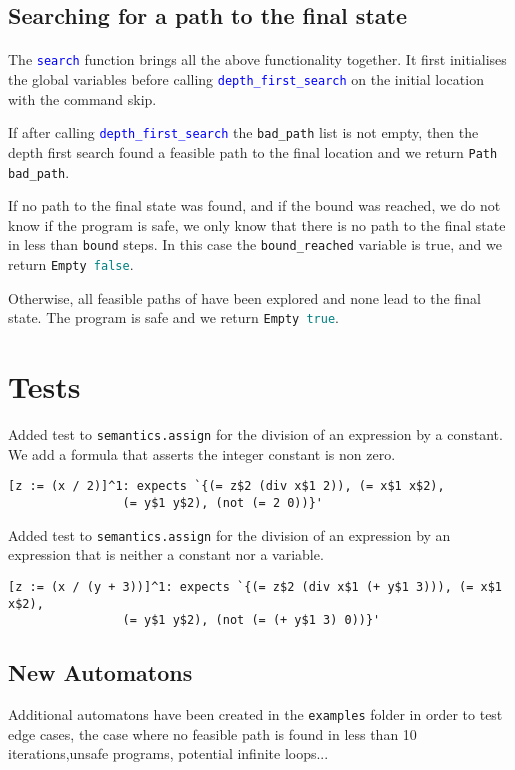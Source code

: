 \documentclass[letterpaper,12pt]{article}
\begin{document}
\subsection{Searching for a path to the final state}
\paragraph{}
The \texttt{\textcolor{blue}{search}} function brings all the above functionality together.
It first initialises the global variables before calling \texttt{\textcolor{blue}{depth\_first\_search}} on the initial location with the command skip.

If after calling \texttt{\textcolor{blue}{depth\_first\_search}} the \texttt{bad\_path} list is not empty, then the depth first search found a feasible path to the final location and we return \texttt{Path bad\_path}.

If no path to the final state was found, and if the bound was reached, we do not know if the program is safe, we only know that there is no path to the final state in less than \texttt{bound} steps. In this case the \texttt{bound\_reached} variable is true, and we return \texttt{Empty \textcolor{teal}{false}}.

Otherwise, all feasible paths of have been explored and none lead to the final state. The program is safe and we return \texttt{Empty \textcolor{teal}{true}}.


\section{Tests}
Added test to \texttt{semantics.assign} for the division of an expression by a constant. We add a formula that asserts the integer constant is non zero.
\begin{verbatim}
[z := (x / 2)]^1: expects `{(= z$2 (div x$1 2)), (= x$1 x$2),
				(= y$1 y$2), (not (= 2 0))}'
\end{verbatim}
Added test to \texttt{semantics.assign} for the division of an expression by an expression that is neither a constant nor a variable.
\begin{verbatim}
[z := (x / (y + 3))]^1: expects `{(= z$2 (div x$1 (+ y$1 3))), (= x$1 x$2),
				(= y$1 y$2), (not (= (+ y$1 3) 0))}'
\end{verbatim}

\subsection{New Automatons}
Additional automatons have been created in the \texttt{examples} folder in order to test edge cases, the case where no feasible path is found in less than 10 iterations,unsafe programs, potential infinite loops...
\end{document}
